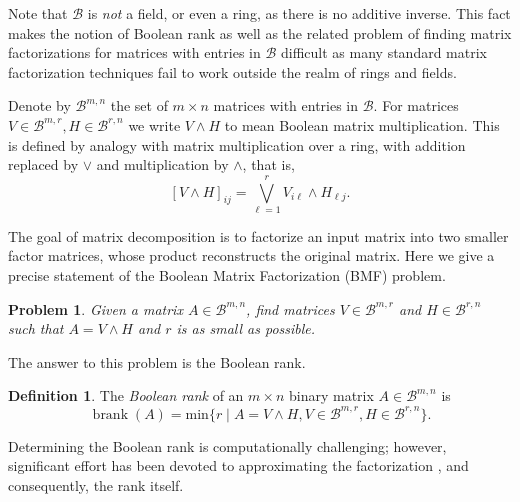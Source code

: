 \documentclass[11pt,letterpaper, reqno]{amsart}
\newtheorem{problem}[theorem]{Problem}
\theoremstyle{definition}
\newtheorem{definition}[theorem]{Definition}
\theoremstyle{remark}
\newcommand{\Bc}{\mathcal{B}}
\DeclareMathOperator{\brank}{brank}
\numberwithin{equation}{section}
\begin{document}
Note that $\Bc$ is \textit{not} a field, or even a ring, as there is no additive inverse. This fact makes the notion of Boolean rank as well as the related problem of finding matrix factorizations for matrices with entries in $\Bc$ difficult as many standard matrix factorization techniques fail to work outside the realm of rings and fields.



Denote by $\Bc^{m,n}$ the set of $m\times n$ matrices with entries in $\Bc$. For matrices $V\in \Bc^{m,r}, H\in \Bc^{r,n}$ we write $V\wedge H$ to mean Boolean matrix multiplication. This is defined by analogy with matrix multiplication over a ring, with addition replaced by $\vee$ and multiplication by $\wedge$, that is,
\[
[V\wedge H]_{ij}=\bigvee_{\ell=1}^r V_{i\ell}\wedge H_{\ell j}.
\]



The goal of matrix decomposition is to factorize an input matrix into two smaller factor matrices, whose product reconstructs the original matrix. Here we give a precise statement of the Boolean Matrix Factorization (BMF) problem.


\begin{problem}
Given a matrix $A\in \Bc^{m,n}$, find matrices $V\in \Bc^{m,r}$ and $H\in \Bc^{r,n}$ such that $A = V\wedge H$ and $r$ is as small as possible.
\end{problem}

The answer to this problem is the Boolean rank.

\begin{definition}\label{def:brank}
    The \textit{Boolean rank} of an $m\times n$ binary matrix $A\in \Bc^{m,n}$ is 
    \[
    \brank(A)=\text{min}\{r \mid A = V\wedge H,V\in \Bc^{m,r}, H\in \Bc^{r,n} \}.
    \]
\end{definition}

Determining the Boolean rank is computationally challenging; however, significant effort has been devoted to approximating the factorization \cite{RecentDevs} \cite{DeSantis21}, and consequently, the rank itself.
\end{document}
